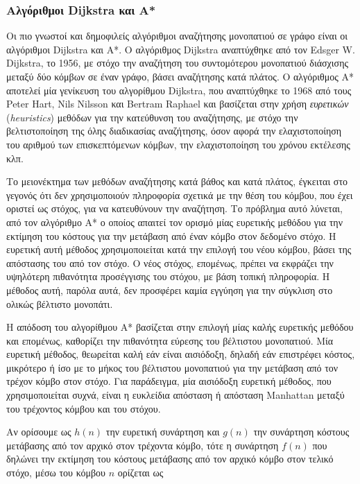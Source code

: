 \subsubsection{Αλγόριθμοι Dijkstra και A*} \label{sssec:dijkstra_astar}
Οι πιο γνωστοί και δημοφιλείς αλγόριθμοι αναζήτησης μονοπατιού σε γράφο είναι οι αλγόριθμοι Dijkstra και A*. Ο αλγόριθμος Dijkstra αναπτύχθηκε από τον Edsger W. Dijkstra, το 1956, με στόχο την αναζήτηση του συντομότερου μονοπατιού διάσχισης μεταξύ δύο κόμβων σε έναν γράφο, βάσει αναζήτησης κατά πλάτος. Ο αλγόριθμος Α* αποτελεί μία γενίκευση του αλγορίθμου Dijkstra, που αναπτύχθηκε το 1968 από τους Peter Hart, Nils Nilsson και Bertram Raphael και βασίζεται στην χρήση \textit{ευρετικών} (\textit{heuristics}) μεθόδων για την κατεύθυνση του αναζήτησης, με στόχο την βελτιστοποίηση της όλης διαδικασίας αναζήτησης, όσον αφορά την ελαχιστοποίηση του αριθμού των επισκεπτόμενων κόμβων, την ελαχιστοποίηση του χρόνου εκτέλεσης κλπ.

\bigskip
Το μειονέκτημα των μεθόδων αναζήτησης κατά βάθος και κατά πλάτος, έγκειται στο γεγονός ότι δεν χρησιμοποιούν πληροφορία σχετικά με την θέση του κόμβου, που έχει οριστεί ως στόχος, για να κατευθύνουν την αναζήτηση. Το πρόβλημα αυτό λύνεται, από τον αλγόριθμο A* ο οποίος απαιτεί τον ορισμό μίας ευρετικής μεθόδου για την εκτίμηση του κόστους για την μετάβαση από έναν κόμβο στον δεδομένο στόχο. Η ευρετική αυτή μέθοδος χρησιμοποιείται κατά την επιλογή του νέου κόμβου, βάσει της απόστασης του από τον στόχο. Ο νέος στόχος, επομένως, πρέπει να εκφράζει την υψηλότερη πιθανότητα προσέγγισης του στόχου, με βάση τοπική πληροφορία. Η μέθοδος αυτή, παρόλα αυτά, δεν προσφέρει καμία εγγύηση για την σύγκλιση στο ολικώς βέλτιστο μονοπάτι.

\bigskip
Η απόδοση του αλγορίθμου A* βασίζεται στην επιλογή μίας καλής ευρετικής μεθόδου και επομένως, καθορίζει την πιθανότητα εύρεσης του βέλτιστου μονοπατιού. Μία ευρετική μέθοδος, θεωρείται καλή εάν είναι αισιόδοξη, δηλαδή εάν επιστρέφει κόστος, μικρότερο ή ίσο με το μήκος του βέλτιστου μονοπατιού για την μετάβαση από τον τρέχον κόμβο στον στόχο. Για παράδειγμα, μία αισιόδοξη ευρετική μέθοδος, που χρησιμοποιείται συχνά, είναι η ευκλείδια απόσταση ή απόσταση Manhattan μεταξύ του τρέχοντος κόμβου και του στόχου.

\bigskip
Αν ορίσουμε ως $h(n)$ την ευρετική συνάρτηση και $g(n)$ την συνάρτηση κόστους μετάβασης από τον αρχικό στον τρέχοντα κόμβο, τότε η συνάρτηση $f(n)$ που δηλώνει την εκτίμηση του κόστους μετάβασης από τον αρχικό κόμβο στον τελικό στόχο, μέσω του κόμβου $n$ ορίζεται ως

